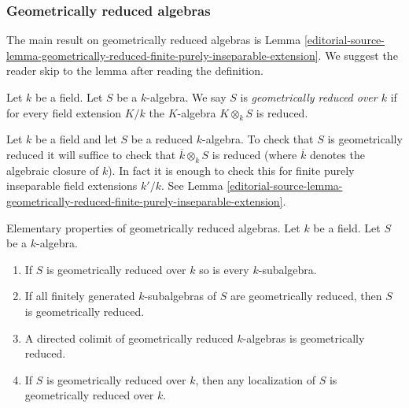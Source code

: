 \subsubsection{Geometrically reduced algebras}
\label{editorial-source-section-geometrically-reduced}

\noindent
The main result on geometrically reduced algebras is
Lemma \ref{editorial-source-lemma-geometrically-reduced-finite-purely-inseparable-extension}.
We suggest the reader skip to the lemma after reading the definition.

\begin{definition}
\label{editorial-source-definition-geometrically-reduced}
Let $k$ be a field. Let $S$ be a $k$-algebra.
We say $S$ is {\it geometrically reduced over $k$}
if for every field extension $K/k$ the
$K$-algebra $K \otimes_k S$ is reduced.
\end{definition}

\noindent
Let $k$ be a field and let $S$ be a reduced $k$-algebra.
To check that $S$ is geometrically reduced it will suffice
to check that $\overline{k} \otimes_k S$ is reduced (where
$\overline{k}$ denotes the algebraic closure of $k$).
In fact it is enough to check this for finite purely inseparable
field extensions $k'/k$. See
Lemma \ref{editorial-source-lemma-geometrically-reduced-finite-purely-inseparable-extension}.

\begin{lemma}
\label{editorial-source-lemma-subalgebra-separable}
Elementary properties of geometrically reduced algebras.
Let $k$ be a field. Let $S$ be a $k$-algebra.
\begin{enumerate}
\item If $S$ is geometrically reduced over $k$ so is every
$k$-subalgebra.
\item If all finitely generated $k$-subalgebras of $S$ are
geometrically reduced, then $S$ is geometrically reduced.
\item A directed colimit of geometrically reduced $k$-algebras
is geometrically reduced.
\item If $S$ is geometrically reduced over $k$, then any localization
of $S$ is geometrically reduced over $k$.
\end{enumerate}
\end{lemma}

